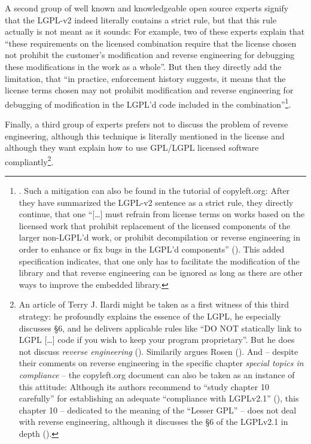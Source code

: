 A second group of well known and knowledgeable open source experts signify that
the LGPL-v2 indeed literally contains a strict rule, but that this rule actually
is not meant as it sounds: For example, two of these experts explain that
\enquote{these requirements on the licensed combination require that the license
chosen not prohibit the customer’s modification and reverse engineering for
debugging these modifications in the work as a whole}. But then they directly
add the limitation, that \enquote{in practice, enforcement history suggests, it
means that the license terms chosen may not prohibit modification and reverse
engineering for debugging of modification in the LGPL’d code included in the
combination}\footnote{\cite[cf.][\nopage wp., chapter LGPLv2.1, section
6]{MogCho2014a}. Such a mitigation can also be found in the tutorial of
copyleft.org: After they have summarized the LGPL-v2 sentence as a strict rule,
they directly continue, that one \enquote{[\ldots] must refrain from license
terms on works based on the licensed work that prohibit replacement of the
licensed components of the larger non-LGPL'd work, or prohibit decompilation or
reverse engineering in order to enhance or fix bugs in the LGPL'd components}
(\cite[cf.][86]{KuhSebGin2014a}). This added specification indicates, that one
only has to facilitate the modification of the library and that reverse
engineering can be ignored as long as there are other ways to improve the
embedded library.}.

Finally, a third group of experts prefers not to discuss the problem of reverse
engineering, although this technique is literally mentioned in the license and
although they want explain how to use GPL/LGPL licensed software
compliantly\footnote{An article of Terry J. Ilardi might be taken as a first
witness of this third strategy: he profoundly explains the essence of the LGPL,
he especially discusses §6, and he delivers applicable rules like \enquote{DO
NOT statically link to LGPL [\ldots] code if you wish to keep your program
proprietary}. But he does not discuss \emph{reverse engineering}
(\cite[cf.][5f]{Ilardi2010a}). Similarily argues Rosen
(\cite[cf.][121ff]{Rosen2005a}). And -- despite their comments on reverse
engineering in the specific chapter \emph{special topics in compliance} -- the
copyleft.org document can also be taken as an instance of this attitude:
Although its authors recommend to \enquote{study chapter 10 carefully} for
establishing an adequate \enquote{compliance with LGPLv2.1}
(\cite[cf.][86]{KuhSebGin2014a}), this chapter 10 -- dedicated to the meaning of
the \enquote{Lesser GPL} -- does not deal with reverse engineering, although it
discusses the §6 of the LGPLv2.1 in depth (\cite[cf.][56ff, esp.
60f]{KuhSebGin2014a}).}.

